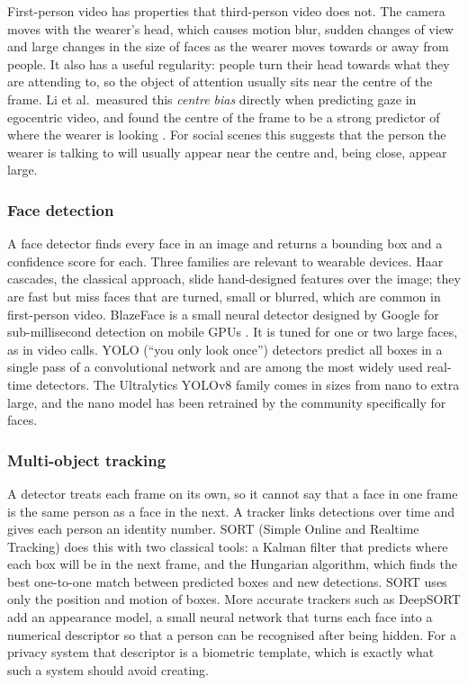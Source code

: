 First-person video has properties that third-person video does not. The camera moves with
the wearer's head, which causes motion blur, sudden changes of view and large changes in
the size of faces as the wearer moves towards or away from people. It also has a useful
regularity: people turn their head towards what they are attending to, so the object of
attention usually sits near the centre of the frame. Li et al.\ measured this
\emph{centre bias} directly when predicting gaze in egocentric video, and found the
centre of the frame to be a strong predictor of where the wearer is looking
\cite{li2013gaze}. For social scenes this suggests that the person the wearer is talking
to will usually appear near the centre and, being close, appear large.

\subsubsection{Face detection}

A face detector finds every face in an image and returns a bounding box and a confidence
score for each. Three families are relevant to wearable devices. Haar cascades, the
classical approach, slide hand-designed features over the image; they are fast but miss
faces that are turned, small or blurred, which are common in first-person video.
BlazeFace is a small neural detector designed by Google for sub-millisecond detection on
mobile GPUs \cite{bazarevsky2019blazeface}. It is tuned for one or two large faces, as in
video calls. YOLO (``you only look once'') detectors predict all boxes in a single pass of
a convolutional network and are among the most widely used real-time detectors. The
Ultralytics YOLOv8 family \cite{yolov8} comes in sizes from nano to extra large, and the
nano model has been retrained by the community specifically for faces.

\subsubsection{Multi-object tracking}

A detector treats each frame on its own, so it cannot say that a face in one frame is the
same person as a face in the next. A tracker links detections over time and gives each
person an identity number. SORT (Simple Online and Realtime Tracking) \cite{sort2016} does
this with two classical tools: a Kalman filter that predicts where each box will be in the
next frame, and the Hungarian algorithm, which finds the best one-to-one match between
predicted boxes and new detections. SORT uses only the position and motion of boxes. More
accurate trackers such as DeepSORT add an appearance model, a small neural network that
turns each face into a numerical descriptor so that a person can be recognised after being
hidden. For a privacy system that descriptor is a biometric template, which is exactly
what such a system should avoid creating.

